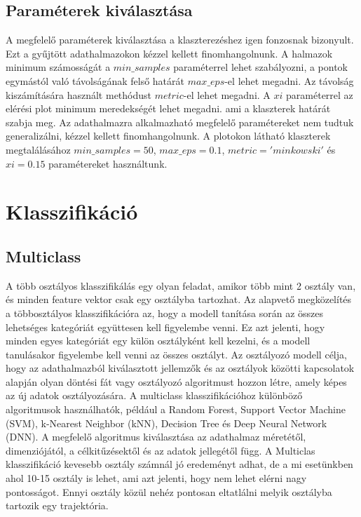 \documentclass[acmtog, authorversion]{acmart}
\begin{document}
\subsection{Paraméterek kiválasztása}
A megfelelő paraméterek kiválasztása a klaszterezéshez igen fonzosnak bizonyult. Ezt a gyűjtött adathalmazokon kézzel kellett finomhangolnunk.
A halmazok minimum számosságát a \begin{math}min\_samples\end{math} paraméterrel lehet szabályozni, a pontok egymástól való távolságának
felső határát \begin{math}max\_eps\end{math}-el lehet megadni. Az távolság kiszámítására használt methódust \begin{math}metric\end{math}-el
lehet megadni. A \begin{math}xi\end{math} paraméterrel az elérési plot minimum meredekségét lehet megadni. ami a klaszterek határát szabja meg.
Az adathalmazra alkalmazható megfelelő paramétereket nem tudtuk generalizálni, kézzel kellett finomhangolnunk. A plotokon látható klaszterek
megtalálásához \begin{math}min\_samples=50\end{math}, \begin{math}max\_eps=0.1\end{math}, \begin{math}metric='minkowski'\end{math} és \begin{math}xi=0.15\end{math}
paramétereket használtunk.
\section{Klasszifikáció}
\subsection{Multiclass}
A több osztályos klasszifikálás egy olyan feladat, amikor több mint 2 osztály van, és minden feature vektor csak egy osztályba tartozhat. Az alapvető megközelítés a többosztályos klasszifikációra az, hogy a modell tanítása során az összes lehetséges kategóriát együttesen kell figyelembe venni. Ez azt jelenti, hogy minden egyes kategóriát egy külön osztályként kell kezelni, és a modell tanulásakor figyelembe kell venni az összes osztályt. Az osztályozó modell célja, hogy az adathalmazból kiválasztott jellemzők és az osztályok közötti kapcsolatok alapján olyan döntési fát vagy osztályozó algoritmust hozzon létre, amely képes az új adatok osztályozására. A multiclass klasszifikációhoz különböző algoritmusok használhatók, például a Random Forest, Support Vector Machine (SVM), k-Nearest Neighbor (kNN), Decision Tree és Deep Neural Network (DNN). A megfelelő algoritmus kiválasztása az adathalmaz méretétől, dimenziójától, a célkitűzésektől és az adatok jellegétől függ.
A Multiclas klasszifikáció kevesebb osztály számnál jó eredeményt adhat, de a mi esetünkben ahol 10-15 osztály is lehet, ami azt jelenti, hogy nem lehet elérni nagy pontosságot. Ennyi osztály közül nehéz pontosan eltatlálni melyik osztályba tartozik egy trajektória.
\end{document}
